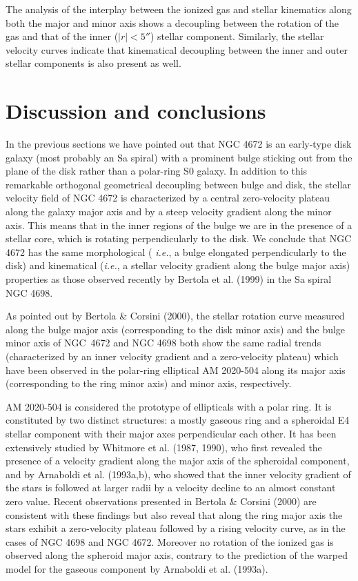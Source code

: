 \documentclass[twocolumns]{aa}
\begin{document}
\bigskip

The analysis of the interplay between the ionized gas and stellar
kinematics along both the major and minor axis shows a decoupling
between the rotation of the gas and that of the inner ($|r|<5''$)
stellar component. Similarly, the stellar velocity curves
indicate that kinematical decoupling between the inner and outer
stellar components is also present as well.


\section{Discussion and conclusions}
\label{sec:n4672_conclusions}

In the previous sections we have pointed out that NGC 4672 is an
early-type disk galaxy (most probably an Sa spiral) with a prominent
bulge sticking out from the plane of the disk rather than a polar-ring
S0 galaxy. In addition to this remarkable orthogonal geometrical
decoupling between bulge and disk, the stellar velocity field of NGC
4672 is characterized by a central zero-velocity plateau along the
galaxy major axis and by a steep velocity gradient along the minor
axis. This means that in the inner regions of the bulge we are in the
presence of a stellar core, which is rotating perpendicularly to the
disk. We conclude that NGC 4672 has the same morphological ({\it
i.e.\/}, a bulge elongated perpendicularly to the disk) and
kinematical ({\it i.e.\/}, a stellar velocity gradient along the bulge
major axis) properties as those observed recently by Bertola et
al. (1999) in the Sa spiral NGC 4698.

\bigskip

As pointed out by Bertola \& Corsini (2000), the stellar rotation
curve measured along the bulge major axis (corresponding to the disk
minor axis) and the bulge minor axis of NGC~4672 and NGC 4698 
both show the same radial trends (characterized by an inner
velocity gradient and a zero-velocity plateau) which have be\-en
observed in the polar-ring elliptical AM 2020-504 along its major axis
(corresponding to the ring minor axis) and minor axis, respectively.

AM 2020-504 is considered the prototype of ellipticals with a polar
ring.  It is constituted by two distinct structures: a mostly gaseous
ring and a spheroidal E4 stellar component with their major axes
perpendicular each other.  It has been extensively studied by Whitmore
et al. (1987, 1990), who first revealed the presence of a velocity
gradient along the major axis of the spheroi\-dal component, and by
Arnaboldi et al. (1993a,b), who showed that the inner velocity
gradient of the stars is followed at larger radii by a velocity
decline to an almost constant zero value.  Recent observations
presented in Bertola \& Corsini (2000) are consistent with these
findings but also reveal that along the ring major axis the stars
exhibit a zero-velocity plateau followed by a rising velocity curve,
as in the cases of NGC 4698 and NGC 4672. Moreover no rotation of the
ionized gas is observed along the spheroid major axis, contrary to the
prediction of the warped model for the gaseous component by Arnaboldi
et al. (1993a).
\end{document}
